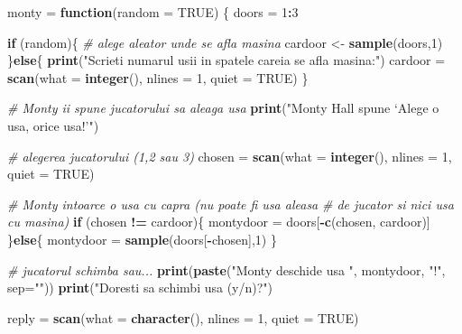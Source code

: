 \documentclass[]{article}
\newenvironment{Shaded}{\begin{snugshade}}{\end{snugshade}}
\newcommand{\CommentTok}[1]{\textcolor[rgb]{0.56,0.35,0.01}{\textit{#1}}}
\newcommand{\ControlFlowTok}[1]{\textcolor[rgb]{0.13,0.29,0.53}{\textbf{#1}}}
\newcommand{\DataTypeTok}[1]{\textcolor[rgb]{0.13,0.29,0.53}{#1}}
\newcommand{\DecValTok}[1]{\textcolor[rgb]{0.00,0.00,0.81}{#1}}
\newcommand{\KeywordTok}[1]{\textcolor[rgb]{0.13,0.29,0.53}{\textbf{#1}}}
\newcommand{\NormalTok}[1]{#1}
\newcommand{\OperatorTok}[1]{\textcolor[rgb]{0.81,0.36,0.00}{\textbf{#1}}}
\newcommand{\OtherTok}[1]{\textcolor[rgb]{0.56,0.35,0.01}{#1}}
\newcommand{\StringTok}[1]{\textcolor[rgb]{0.31,0.60,0.02}{#1}}
\begin{document}
\begin{Shaded}
\begin{Highlighting}[]
\NormalTok{monty =}\StringTok{ }\ControlFlowTok{function}\NormalTok{(}\DataTypeTok{random =} \OtherTok{TRUE}\NormalTok{) \{}
\NormalTok{  doors =}\StringTok{ }\DecValTok{1}\OperatorTok{:}\DecValTok{3}
  
  \ControlFlowTok{if}\NormalTok{ (random)\{}
    \CommentTok{# alege aleator unde se afla masina}
\NormalTok{    cardoor <-}\StringTok{ }\KeywordTok{sample}\NormalTok{(doors,}\DecValTok{1}\NormalTok{)}
\NormalTok{  \}}\ControlFlowTok{else}\NormalTok{\{}
    \KeywordTok{print}\NormalTok{(}\StringTok{"Scrieti numarul usii in spatele careia se afla masina:"}\NormalTok{)}
\NormalTok{    cardoor =}\StringTok{ }\KeywordTok{scan}\NormalTok{(}\DataTypeTok{what =} \KeywordTok{integer}\NormalTok{(), }\DataTypeTok{nlines =} \DecValTok{1}\NormalTok{, }\DataTypeTok{quiet =} \OtherTok{TRUE}\NormalTok{)}
\NormalTok{  \}}
  
  \CommentTok{# Monty ii spune jucatorului sa aleaga usa }
  \KeywordTok{print}\NormalTok{(}\StringTok{"Monty Hall spune ‘Alege o usa, orice usa!’"}\NormalTok{)}
  
  \CommentTok{# alegerea jucatorului (1,2 sau 3)}
\NormalTok{  chosen =}\StringTok{ }\KeywordTok{scan}\NormalTok{(}\DataTypeTok{what =} \KeywordTok{integer}\NormalTok{(), }\DataTypeTok{nlines =} \DecValTok{1}\NormalTok{, }\DataTypeTok{quiet =} \OtherTok{TRUE}\NormalTok{)}
  
  \CommentTok{# Monty intoarce o usa cu capra (nu poate fi usa aleasa }
  \CommentTok{# de jucator si nici usa cu masina)}
  \ControlFlowTok{if}\NormalTok{ (chosen }\OperatorTok{!=}\StringTok{ }\NormalTok{cardoor)\{}
\NormalTok{     montydoor =}\StringTok{ }\NormalTok{doors[}\OperatorTok{-}\KeywordTok{c}\NormalTok{(chosen, cardoor)]}
\NormalTok{  \}}\ControlFlowTok{else}\NormalTok{\{}
\NormalTok{    montydoor =}\StringTok{ }\KeywordTok{sample}\NormalTok{(doors[}\OperatorTok{-}\NormalTok{chosen],}\DecValTok{1}\NormalTok{)}
\NormalTok{  \} }
  
  \CommentTok{# jucatorul schimba sau...}
  \KeywordTok{print}\NormalTok{(}\KeywordTok{paste}\NormalTok{(}\StringTok{"Monty deschide usa "}\NormalTok{, montydoor, }\StringTok{"!"}\NormalTok{, }\DataTypeTok{sep=}\StringTok{""}\NormalTok{))}
  \KeywordTok{print}\NormalTok{(}\StringTok{"Doresti sa schimbi usa (y/n)?"}\NormalTok{)}
  
\NormalTok{  reply =}\StringTok{ }\KeywordTok{scan}\NormalTok{(}\DataTypeTok{what =} \KeywordTok{character}\NormalTok{(), }\DataTypeTok{nlines =} \DecValTok{1}\NormalTok{, }\DataTypeTok{quiet =} \OtherTok{TRUE}\NormalTok{)}
  

\end{Highlighting}
\end{Shaded}
\end{document}
